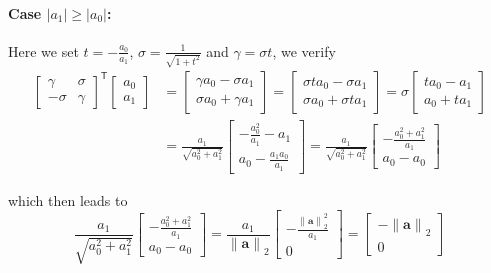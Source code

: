 \documentclass{article}
\begin{document}
\paragraph{Case $\left\lvert a_{1}\right\rvert \geq \left\lvert a_{0}\right\rvert$:} Here we set $t = -\frac{a_{0}}{a_{1}}$, $\sigma = \frac{1}{\sqrt{1 + t^{2}}}$ and $\gamma = \sigma t$, we verify
\begin{align*}
    \begin{bmatrix}
    \gamma & \sigma \\
    -\sigma & \gamma
    \end{bmatrix}^{\mathsf{T}}\begin{bmatrix}
        a_{0} \\ a_{1}
    \end{bmatrix} &= \begin{bmatrix}
        \gamma a_{0} - \sigma a_{1} \\
        \sigma a_{0} + \gamma a_{1}
    \end{bmatrix} = \begin{bmatrix}
        \sigma t a_{0} - \sigma a_{1} \\
        \sigma a_{0} + \sigma t a_{1}
    \end{bmatrix} = \sigma \begin{bmatrix}
        t a_{0} - a_{1} \\
        a_{0} + t a_{1}
    \end{bmatrix} \\[1mm]
    &= \frac{a_{1}}{\sqrt{a_{0}^{2} +a_{1}^{2}}}\begin{bmatrix}
        -\frac{a_{0}^{2}}{a_{1}} - a_{1} \\
        a_{0} - \frac{a_{1}a_{0}}{a_{1}}
    \end{bmatrix} = \frac{a_{1}}{\sqrt{a_{0}^{2} +a_{1}^{2}}}\begin{bmatrix}
        -\frac{a_{0}^{2} + a_{1}^{2}}{a_{1}} \\
        a_{0} - a_{0}
    \end{bmatrix}
\end{align*}

\pagebreak

\noindent which then leads to
\begin{equation*}
     \frac{a_{1}}{\sqrt{a_{0}^{2} +a_{1}^{2}}}\begin{bmatrix}
        -\frac{a_{0}^{2} + a_{1}^{2}}{a_{1}} \\
        a_{0} - a_{0}
    \end{bmatrix}  = \frac{a_{1}}{\left\lVert \mathbf{a} \right\rVert_{2}}\begin{bmatrix}
        -\frac{\left\lVert \mathbf{a} \right\rVert_{2}^{2}}{a_{1}} \\
        0
    \end{bmatrix} =
    \begin{bmatrix}
   -\left\lVert \mathbf{a} \right\rVert_{2} \\
        0
    \end{bmatrix}
\end{equation*}
\end{document}
